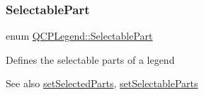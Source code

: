 \mbox{\label{class_q_c_p_legend_a5404de8bc1e4a994ca4ae69e2c7072f1}} 
\subsubsection{\texorpdfstring{Selectable\+Part}{SelectablePart}\hspace{0.1cm}{\footnotesize\ttfamily [2/2]}}
{\footnotesize\ttfamily enum \hyperlink{class_q_c_p_legend_a5404de8bc1e4a994ca4ae69e2c7072f1}{Q\+C\+P\+Legend\+::\+Selectable\+Part}}

Defines the selectable parts of a legend

\begin{DoxySeeAlso}{See also}
\hyperlink{class_q_c_p_legend_a2aee309bb5c2a794b1987f3fc97f8ad8}{set\+Selected\+Parts}, \hyperlink{class_q_c_p_legend_a9ce60aa8bbd89f62ae4fa83ac6c60110}{set\+Selectable\+Parts} 
\end{DoxySeeAlso}

